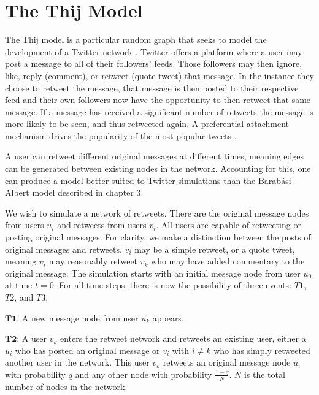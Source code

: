 \chapter{The Thij Model}
\label{section:Thij model}
The Thij model is a particular random graph that seeks to model the development of a Twitter network 
 \cite{thij}. Twitter offers a platform where a user may post a message
to all of their followers' feeds. Those followers may then ignore, like, reply (comment), or retweet (quote tweet) that message. In the
instance they choose to retweet the message, that message is then posted to their respective feed and their own
followers now have the opportunity to then retweet that same message. If a
message has received a significant number of retweets the message is more likely to be seen, and thus
retweeted again. A preferential attachment mechanism drives the popularity of the most popular tweets \cite{Aparicio}.

A user can retweet different original messages at different times, meaning edges can be generated between
existing nodes in the network. Accounting for this, one can produce
a model better suited to Twitter simulations than the Barabási–Albert model described in chapter 3.

We wish to simulate a network of retweets. There are the original message nodes from users $u_i$ and retweets from users $v_i$. All users
are capable of retweeting or posting original messages. For clarity, we make a distinction between the posts of original messages and retweets.
$v_i$ may be a simple retweet, or a quote tweet, meaning $v_i$ may reasonably retweet $v_k$ who may have added commentary to the original message.
 The simulation starts with an initial message node from user $u_{0}$ at time $t=0$. For all time-steps, there is now the possibility of three events: $T1$,
$T2$, and $T3$. 

\vspace{3mm}

$\pmb{T1}$: A new message node from user $u_k$ appears.

\vspace{3mm}

$\pmb{T2}$: A user $v_k$ enters the retweet network and retweets an existing user, either a $u_i$ who has posted an original message or $v_i$ with $i \neq k$ who
has simply retweeted another user in the network. This user $v_k$ retweets an original message node $u_i$ with 
probability $q$ and any other node with probability $\frac{1-q}{N}$. $N$ is the total number of nodes in the network.


